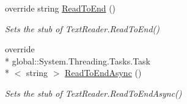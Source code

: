 \begin{DoxyCompactItemize}
override string \hyperlink{class_system_1_1_i_o_1_1_fakes_1_1_stub_text_reader_ac95ab5d66452ff5b35a4e7bae493c98d}{Read\-To\-End} ()
\begin{DoxyCompactList}\small\item\em Sets the stub of Text\-Reader.\-Read\-To\-End()\end{DoxyCompactList}\item 
override \\*
global\-::\-System.\-Threading.\-Tasks.\-Task\\*
$<$ string $>$ \hyperlink{class_system_1_1_i_o_1_1_fakes_1_1_stub_text_reader_a1d24c50ca90f1a67f8efd8118dfb72bc}{Read\-To\-End\-Async} ()
\begin{DoxyCompactList}\small\item\em Sets the stub of Text\-Reader.\-Read\-To\-End\-Async()\end{DoxyCompactList}\end{DoxyCompactItemize}
